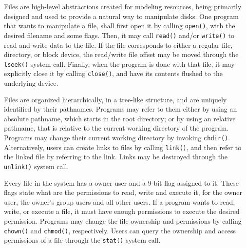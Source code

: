 \documentclass[10pt,a4paper]{article}
\begin{document}
Files are high-level abstractions created for modeling resources, being primarily designed and used to provide a natural way to manipulate disks. One program that wants to manipulate a file, shall first open it by calling \texttt{open()}, with the desired filename and some flags. Then, it may call \texttt{read()} and/or \texttt{write()} to read and write data to the file. If the file corresponds to either a regular file, directory, or block device, the read/write file offset may be moved through the \texttt{lseek()} system call. Finally, when the program is done with that file, it may explicitly close it by calling \texttt{close()}, and have its contents flushed to the underlying device.

Files are organized hierarchically, in a tree-like structure, and are uniquely identified by their pathnames. Programs may refer to them either by using an absolute pathname, which starts in the root directory; or by using an relative pathname, that is relative to the current working directory of the program. Programs may change their current working directory by invoking \texttt{chdir()}. Alternatively, users can create links to files by calling \texttt{link()}, and then refer to the linked file by referring to the link. Links may be destroyed through the \texttt{unlink()} system call.

Every file in the system has a owner user and a 9-bit flag assigned to it. These flags state what are the permissions to read, write and execute it, for the owner user, the owner's group users and all other users. If a program wants to read, write, or execute a file, it must have enough permissions to execute the desired permission. Programs may change the file ownership and permissions by calling \texttt{chown()} and \texttt{chmod()}, respectively. Users can query the ownership and access permissions of a file through the \texttt{stat()} system call.
\end{document}
